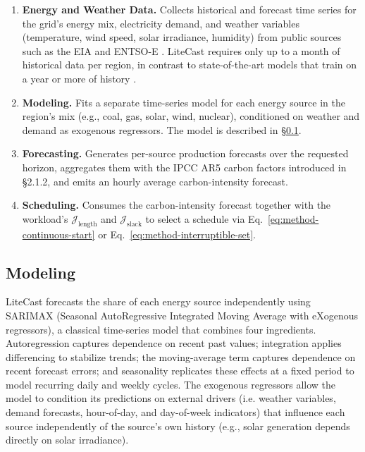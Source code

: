 \begin{enumerate}
    \item \textbf{Energy and Weather Data.} Collects historical and forecast time series for the grid's energy mix, electricity demand, and weather variables (temperature, wind speed, solar irradiance, humidity) from public sources such as the EIA \cite{eia_data} and ENTSO-E \cite{entsoe_data}. LiteCast requires only up to a month of historical data per region, in contrast to state-of-the-art models that train on a year or more of history \cite{maji_carboncast_2022}.
    \item \textbf{Modeling.} Fits a separate time-series model for each energy source in the region's mix (e.g., coal, gas, solar, wind, nuclear), conditioned on weather and demand as exogenous regressors. The model is described in \S\ref{sec:method-model}.
    \item \textbf{Forecasting.} Generates per-source production forecasts over the requested horizon, aggregates them with the IPCC AR5 carbon factors \cite{ipcc_carbon_factors_2014} introduced in \S2.1.2, and emits an hourly average carbon-intensity forecast.
    \item \textbf{Scheduling.} Consumes the carbon-intensity forecast together with the workload's $\mathcal{J}_{\text{length}}$ and $\mathcal{J}_{\text{slack}}$ to select a schedule via Eq.~\ref{eq:method-continuous-start} or Eq.~\ref{eq:method-interruptible-set}.
\end{enumerate}

\subsection{Modeling}
\label{sec:method-model}

LiteCast forecasts the share of each energy source independently using SARIMAX (Seasonal AutoRegressive Integrated Moving Average with eXogenous regressors), a classical time-series model that combines four ingredients.
Autoregression captures dependence on recent past values; integration applies differencing to stabilize trends; the moving-average term captures dependence on recent forecast errors; and seasonality replicates these effects at a fixed period to model recurring daily and weekly cycles.
The exogenous regressors allow the model to condition its predictions on external drivers (i.e. weather variables, demand forecasts, hour-of-day, and day-of-week indicators) that influence each source independently of the source's own history (e.g., solar generation depends directly on solar irradiance).

